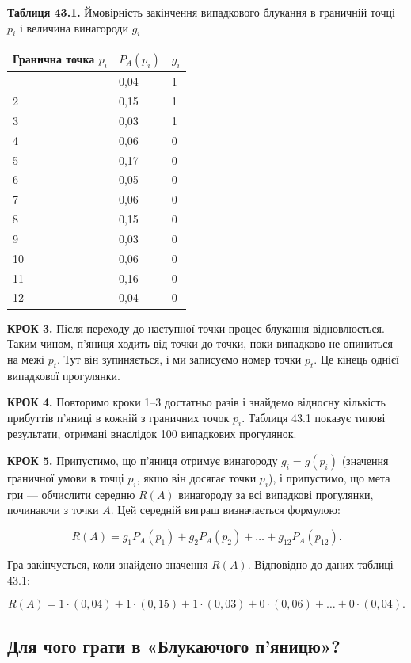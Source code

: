 \documentclass[
  ukrainian,
]{article}
\newcounter{none} %
\begin{document}
\textbf{Таблиця 43.1.} Ймовірність закінчення випадкового блукання в
граничній точці \(p_i\) і величина винагороди \(g_i\)

{\def\LTcaptype{none} %
\begin{longtable}[]{@{}lll@{}}
\toprule\noalign{}
Гранична точка \(p_i\) & \(P_A(p_i)\) & \(g_i\) \\
\midrule\noalign{}
\endhead
\bottomrule\noalign{}
\endlastfoot
1 & 0,04 & 1 \\
2 & 0,15 & 1 \\
3 & 0,03 & 1 \\
4 & 0,06 & 0 \\
5 & 0,17 & 0 \\
6 & 0,05 & 0 \\
7 & 0,06 & 0 \\
8 & 0,15 & 0 \\
9 & 0,03 & 0 \\
10 & 0,06 & 0 \\
11 & 0,16 & 0 \\
12 & 0,04 & 0 \\
\end{longtable}
}

\textbf{КРОК 3.} Після переходу до наступної точки процес блукання
відновлюється. Таким чином, п'яниця ходить від точки до точки, поки
випадково не опиниться на межі \(p_t\). Тут він зупиняється, і ми
записуємо номер точки \(p_t\). Це кінець однієї випадкової прогулянки.

\textbf{КРОК 4.} Повторимо кроки 1--3 достатньо разів і знайдемо
відносну кількість прибуттів п'яниці в кожній з граничних точок \(p_i\).
Таблиця 43.1 показує типові результати, отримані внаслідок 100
випадкових прогулянок.

\textbf{КРОК 5.} Припустимо, що п'яниця отримує винагороду
\(g_i = g(p_i)\) (значення граничної умови в точці \(p_i\), якщо він
досягає точки \(p_i\)), і припустимо, що мета гри --- обчислити середню
\(R(A)\) винагороду за всі випадкові прогулянки, починаючи з точки
\(A\). Цей середній виграш визначається формулою:

\[
R(A) = g_1 P_A(p_1) + g_2 P_A(p_2) + \dots + g_{12} P_A(p_{12}).
\]

Гра закінчується, коли знайдено значення \(R(A)\). Відповідно до даних
таблиці 43.1:

\[
R(A) = 1\cdot(0{,}04) + 1\cdot(0{,}15) + 1\cdot(0{,}03) + 0\cdot(0{,}06) + \dots + 0\cdot(0{,}04).
\]

\subsection{Для чого грати в «Блукаючого
п'яницю»?}\label{ux434ux43bux44f-ux447ux43eux433ux43e-ux433ux440ux430ux442ux438-ux432-ux431ux43bux443ux43aux430ux44eux447ux43eux433ux43e-ux43fux44fux43dux438ux446ux44e}
\end{document}
